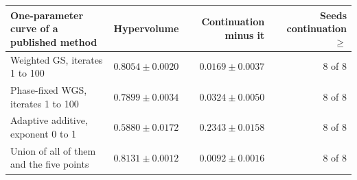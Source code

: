 \begin{tabular}{@{}lrrr@{}}
\toprule
One-parameter curve of a published method & Hypervolume & Continuation minus it & Seeds continuation $\ge$ \\
\midrule
Weighted GS, iterates 1 to 100 & $0.8054\pm0.0020$ & $0.0169\pm0.0037$ & 8 of 8 \\
Phase-fixed WGS, iterates 1 to 100 & $0.7899\pm0.0034$ & $0.0324\pm0.0050$ & 8 of 8 \\
Adaptive additive, exponent 0 to 1 & $0.5880\pm0.0172$ & $0.2343\pm0.0158$ & 8 of 8 \\
Union of all of them and the five points & $0.8131\pm0.0012$ & $0.0092\pm0.0016$ & 8 of 8 \\
\bottomrule
\end{tabular}
